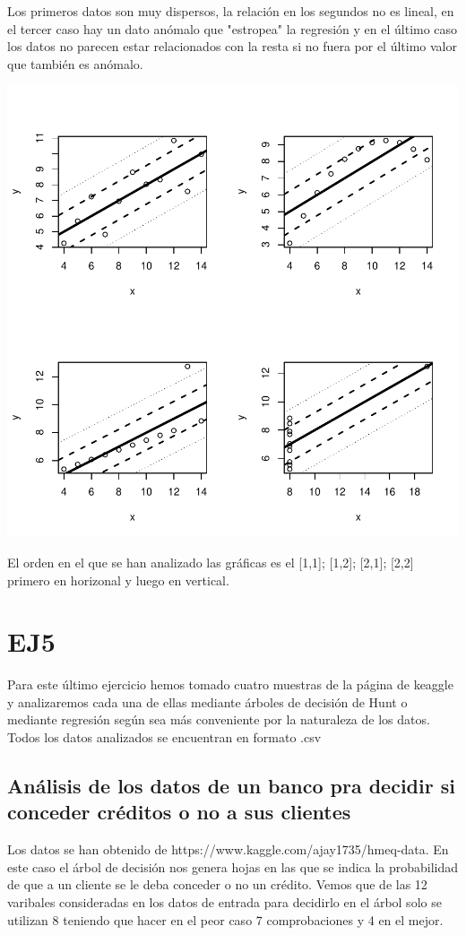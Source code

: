 \documentclass [a4paper] {article}
\begin{document}
Los primeros datos son muy dispersos,
la relación en los segundos no es lineal,
en el tercer caso hay un dato anómalo que "estropea" la regresión y
en el último caso los datos no parecen estar relacionados con la resta si no fuera por el último valor que también es anómalo.
\begin{center}
\includegraphics{entrega-plot_regresion4}
\end{center}
El orden en el que se han analizado las gráficas es el [1,1]; [1,2]; [2,1]; [2,2] primero en horizonal y luego en vertical.

\newpage
\section{EJ5}
Para este último ejercicio hemos tomado cuatro muestras de la página de keaggle y analizaremos cada una de ellas mediante árboles de decisión de Hunt
o mediante regresión según sea más conveniente por la naturaleza de los datos.
Todos los datos analizados se encuentran en formato .csv

\subsection{Análisis de los datos de un banco pra decidir si conceder créditos o no a sus clientes}
Los datos se han obtenido de https://www.kaggle.com/ajay1735/hmeq-data.
En este caso el árbol de decisión nos genera hojas en las que se indica la probabilidad de que a un cliente se le deba conceder o no un crédito.
Vemos que de las 12 varibales consideradas en los datos de entrada para decidirlo en el árbol solo se utilizan 8 teniendo que hacer en el peor caso 7 comprobaciones y 4 en el mejor.
\end{document}
